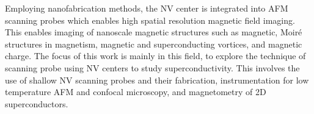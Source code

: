 Employing nanofabrication methods, the \gls{NV} center is integrated into \gls{AFM} scanning probes which enables high spatial resolution magnetic field imaging. This enables imaging of nanoscale magnetic structures such as magnetic\cite{sunMagneticDomainsDomain2021}, Moir\'e structures in magnetism\cite{songDirectVisualizationMagnetic2021,wongSupermoireSpinTextures2026}, magnetic and superconducting vortices\cite{rondinStrayfieldImagingMagnetic2013,thielQuantitativeNanoscaleVortex2016}, and magnetic charge\cite{tanRevealingEmergentMagnetic2024}. The focus of this work is mainly in this field, to explore the technique of scanning probe using \gls{NV} centers to study superconductivity. This involves the use of shallow \gls{NV} scanning probes and their fabrication, instrumentation for low temperature \gls{AFM} and confocal microscopy, and magnetometry of 2D superconductors.